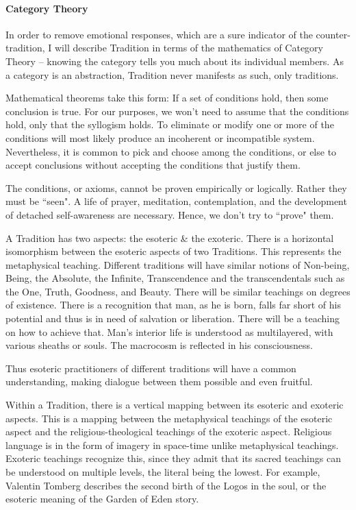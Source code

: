\paragraph{Category Theory}
In order to remove emotional responses, which are a sure indicator of the counter-tradition, I will describe Tradition in terms of the mathematics of Category Theory – knowing the category tells you much about its individual members. As a category is an abstraction, Tradition never manifests as such, only traditions.

Mathematical theorems take this form: If a set of conditions hold, then some conclusion is true. For our purposes, we won't need to assume that the conditions hold, only that the syllogism holds. To eliminate or modify one or more of the conditions will most likely produce an incoherent or incompatible system. Nevertheless, it is common to pick and choose among the conditions, or else to accept conclusions without accepting the conditions that justify them.

The conditions, or axioms, cannot be proven empirically or logically. Rather they must be ``seen". A life of prayer, meditation, contemplation, and the development of detached self-awareness are necessary. Hence, we don't try to ``prove" them.

A Tradition has two aspects: the esoteric \& the exoteric. There is a horizontal isomorphism between the esoteric aspects of two Traditions. This represents the metaphysical teaching. Different traditions will have similar notions of Non-being, Being, the Absolute, the Infinite, Transcendence and the transcendentals such as the One, Truth, Goodness, and Beauty. There will be similar teachings on degrees of existence. There is a recognition that man, as he is born, falls far short of his potential and thus is in need of salvation or liberation. There will be a teaching on how to achieve that. Man's interior life is understood as multilayered, with various sheaths or souls. The macrocosm is reflected in his consciousness.

Thus esoteric practitioners of different traditions will have a common understanding, making dialogue between them possible and even fruitful.

Within a Tradition, there is a vertical mapping between its esoteric and exoteric aspects. This is a mapping between the metaphysical teachings of the esoteric aspect and the religious-theological teachings of the exoteric aspect. Religious language is in the form of imagery in space-time unlike metaphysical teachings. Exoteric teachings recognize this, since they admit that its sacred teachings can be understood on multiple levels, the literal being the lowest. For example, Valentin Tomberg describes the second birth of the Logos in the soul, or the esoteric meaning of the Garden of Eden story.


